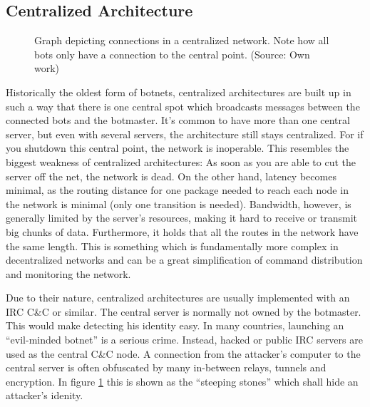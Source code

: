 \documentclass{llncs}
\begin{document}
\subsection{Centralized Architecture}
%
%
\begin{figure}[htbp]
  \centering
  \caption{Graph depicting connections in a centralized network. Note
    how all bots only have a connection to the central point. (Source: Own work)}
  \label{central-network}
\end{figure}
Historically the oldest form of botnets, centralized architectures are
built up in such a way that there is one central spot which broadcasts
messages between the connected bots and the botmaster.  It's common to
have more than one central server\cite{td1sc}, but even with several
servers, the architecture still stays centralized. For if you shutdown
this central point, the network is inoperable. This resembles the
biggest weakness of centralized architectures: As soon as you are able
to cut the server off the net, the network is dead. On the other hand,
latency becomes minimal, as the routing distance for one package
needed to reach each node in the network is minimal (only one
transition is needed). Bandwidth, however, is generally limited by the
server's resources, making it hard to receive or transmit big chunks
of data. Furthermore, it holds that all the routes in the network have
the same length. This is something which is fundamentally more complex
in decentralized networks and can be a great simplification of command
distribution and monitoring the network.

Due to their nature, centralized architectures are usually implemented
with an IRC C\&C or similar\cite{cooke2005zombie}. The central server
is normally not owned by the botmaster. This would make detecting his
identity easy. In many countries, launching an ``evil-minded botnet''
is a serious crime. Instead, hacked or public IRC servers are used as
the central C\&C node. A connection from the attacker's computer to
the central server is often obfuscated by many in-between relays,
tunnels and encryption. In figure
\ref{central-network} this is shown as the ``steeping stones'' which
shall hide an attacker's idenity.
\end{document}
